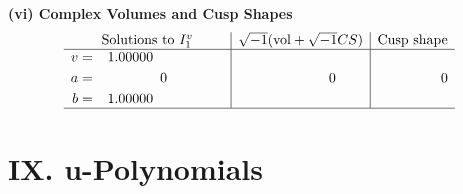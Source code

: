 \documentclass[1p]{elsarticle_modified}
\theoremstyle{definition}
\newcommand{\I}{\sqrt{-1}}
\begin{document}
\newpage\flushleft \textbf{(vi) Complex Volumes and Cusp Shapes}
$$\begin{array}{c|c|c}  
\text{Solutions to }I^v_{1}& \I (\text{vol} + \sqrt{-1}CS) & \text{Cusp shape}\\
 \hline 
\begin{aligned}
v &= \phantom{-}1.00000\phantom{ +0.000000I} \\
a &= \phantom{-0.000000 } 0 \\
b &= \phantom{-}1.00000\phantom{ +0.000000I}\end{aligned}
 & \phantom{-0.000000 } 0 & \phantom{-0.000000 } 0\\
 \hline 
 \end{array}$$\newpage
\newpage\renewcommand{\arraystretch}{1}
\centering \section*{ IX. u-Polynomials}
\end{document}
